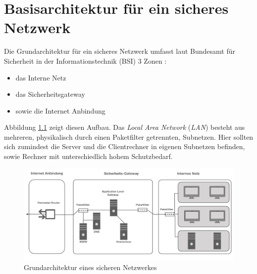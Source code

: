 \chapter{Basisarchitektur für ein sicheres Netzwerk}
\label{K1}
Die Grundarchitektur für ein sicheres Netzwerk umfasst laut Bundesamt für Sicherheit in der Informationstechnik (BSI) 3 Zonen \cite{isi-lana}: 
\begin{itemize}
	\item das Interne Netz 
	\item das Sicherheitsgateway
	\item sowie die Internet Anbindung	
\end{itemize}
Abbildung \ref{grundarch} zeigt diesen Aufbau. Das \emph{Local Area Network} (\emph{LAN}) besteht aus mehreren, physikalisch durch einen Paketfilter getrennten, Subnetzen. Hier sollten sich zumindest die Server und die Clientrechner in eigenen Subnetzen befinden, sowie Rechner mit unterschiedlich hohem Schutzbedarf. 

\begin{figure}[h]
	\includegraphics[width=\linewidth]{grundarchitektur}
	\caption{Grundarchitektur eines sicheren Netzwerkes}
	\label{grundarch}
\end{figure}


